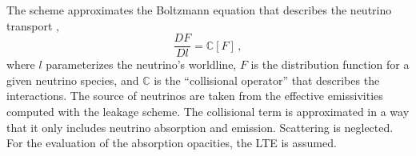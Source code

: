 The scheme approximates the Boltzmann equation that describes 
the neutrino transport \citep{Thorne:1981}, 
\begin{equation*}
\frac{D F}{D l} = \mathbb{C}[F]\, ,
\end{equation*}
where $l$ parameterizes the neutrino's worldline, 
$F$ is the distribution function for a given neutrino species, and $\mathbb{C}$ 
is the ``collisional operator'' that describes the interactions.
%
%
The source of neutrinos are taken from the effective emissivities computed 
with the leakage scheme.
The collisional term is approximated in a way that it only includes neutrino 
absorption and emission. Scattering is neglected. 
For the evaluation of the absorption opacities, 
the \ac{LTE} is assumed.
%
%
